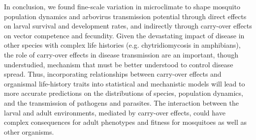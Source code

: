 \documentclass{bmcart}
\begin{document}
In conclusion, we found fine-scale variation in microclimate to shape mosquito population dynamics and arbovirus transmission potential through direct effects on larval survival and development rates, and indirectly through carry-over effects on vector competence and fecundity. Given the devastating impact of disease in other species with complex life histories (e.g. chytridiomycosis in amphibians), the role of carry-over effects in disease transmission are an important, though understudied, mechanism that must be better understood to control disease spread. Thus, incorporating relationships between carry-over effects and organismal life-history traits into statistical and mechanistic models will lead to more accurate predictions on the distributions of species, population dynamics, and the transmission of pathogens and parasites. The interaction between the larval and adult environments, mediated by carry-over effects, could have complex consequences for adult phenotypes and fitness for mosquitoes as well as other organisms.

\end{document}
